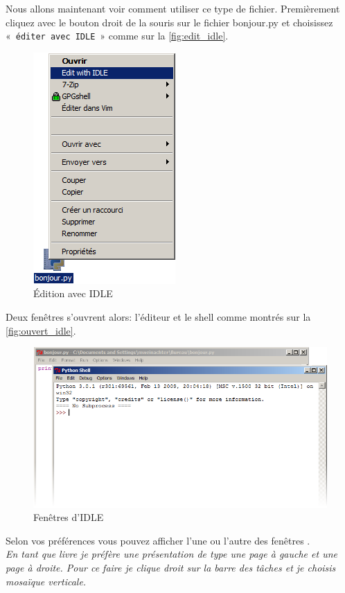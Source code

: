Nous allons maintenant voir comment utiliser ce type de fichier.
Premièrement cliquez avec le bouton droit de la souris sur le fichier bonjour.py et choisissez «~\texttt{éditer avec IDLE}~» comme sur la \autoref{fig:edit_idle}.
\begin{figure}[h!]
\centering
\includegraphics[scale=0.5]{images/edit_idle.png} 
\caption{Édition avec IDLE}
\label{fig:edit_idle}
\end{figure}

Deux fenêtres s'ouvrent alors: l'éditeur et le shell comme montrés sur 
la \autoref{fig:ouvert_idle}.
\begin{figure}[h!]
\centering
\includegraphics[scale=0.5]{images/ouvert_idle.png} 
\caption{Fenêtres d'IDLE}
\label{fig:ouvert_idle}
\end{figure}

Selon vos préférences vous pouvez afficher l'une ou l'autre des fenêtres . \\

\emph{En tant que livre je préfère une présentation de type une page à gauche et
 une page à droite. Pour ce faire je clique droit sur la barre des tâches et je choisis mosaïque verticale.}\\


